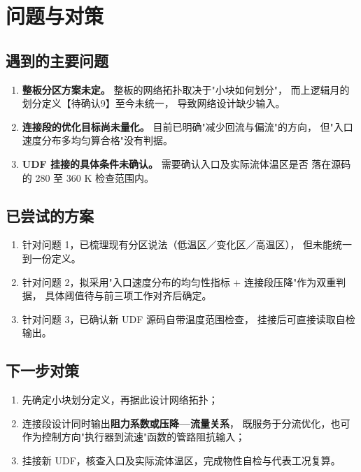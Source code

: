 \documentclass[stage2,fontset=fandol]{ydzjreport}
\begin{document}
\section{问题与对策}

\subsection{遇到的主要问题}

\begin{enumerate}
  \item \textbf{整板分区方案未定。} 整板的网络拓扑取决于"小块如何划分"，
        而上逻辑月的划分定义【待确认9】至今未统一，
        导致网络设计缺少输入。
  \item \textbf{连接段的优化目标尚未量化。} 目前已明确"减少回流与偏流"的方向，
        但"入口速度分布多均匀算合格"没有判据。
  \item \textbf{UDF 挂接的具体条件未确认。} 需要确认入口及实际流体温区是否
        落在源码的 280 至 360 K 检查范围内。
\end{enumerate}

\subsection{已尝试的方案}

\begin{enumerate}
  \item 针对问题 1，已梳理现有分区说法（低温区／变化区／高温区），
        但未能统一到一份定义。
  \item 针对问题 2，拟采用"入口速度分布的均匀性指标 + 连接段压降"作为双重判据，
        具体阈值待与前三项工作对齐后确定。
  \item 针对问题 3，已确认新 UDF 源码自带温度范围检查，
        挂接后可直接读取自检输出。
\end{enumerate}

\subsection{下一步对策}

\begin{enumerate}
  \item 先确定小块划分定义，再据此设计网络拓扑；
  \item 连接段设计同时输出\textbf{阻力系数或压降—流量关系}，
        既服务于分流优化，也可作为控制方向"执行器到流速"函数的管路阻抗输入；
  \item 挂接新 UDF，核查入口及实际流体温区，完成物性自检与代表工况复算。
\end{enumerate}
\end{document}
